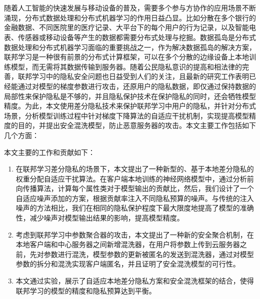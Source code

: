 \vspace{-2.5cm}
\chapter*{}

随着人工智能的快速发展与移动设备的普及，需要多个参与方协作的应用场景不断涌现，分布式数据处理和分布式机器学习的作用日益凸显。比如分散在多个银行的金融数据、不同医院里的医疗记录、大平台下的每个用户的行为记录，以及智能电表、传感器或移动设备等产生的数据都需要分布式处理与挖掘。数据孤岛是分布式数据处理和分布式机器学习面临的重要挑战之一，作为解决数据孤岛的解决方案，联邦学习是一种很有前景的分布式计算框架，可以在多个分散的边缘设备上本地训练模型，而无需将其数据传输到服务器。随着公民隐私意识的提高和相法律的完善，联邦学习中的隐私安全问题也日益受到人们的关注，且最新的研究工作表明已经能通过对模型的梯度参数进行攻击，还原用户的隐私数据，即仅通过保持数据的局部性来保护隐私是不够的，并且隐私保护技术在保护隐私的同时，还会牺牲模型精度。为此，本文使用差分隐私技术来保护联邦学习中用户的隐私，并针对分布式场景，分析模型训练过程中针对梯度下降算法的自适应干扰机制，实现提高模型精度的目的，并提出安全混洗模型，防止恶意服务器的攻击。本文主要工作包括如下几个方面：

本文主要的工作和贡献如下：
\begin{enumerate}
\item 在联邦学习差分隐私的场景下，本文提出了一种新型的、基于本地差分隐私的权重分配自适应干扰算法。在客户端本地训练的神经网络模型中，通过分析前向传播算法，计算每个属性类对于模型输出的贡献比，然后，我们设计了一个自适应噪声添加的方案，根据贡献率注入不同隐私预算的噪声。与传统的注入噪声的方法相比，我们在相同的隐私保护程度下最大限度地提高了模型的准确性，减少噪声对模型输出结果的影响，提高模型精度。
\item 考虑到联邦学习中参数聚合器的攻击，本文提出了一种新的安全聚合机制，在本地客户端和中心服务器之间新增混洗器，在用户将参数上传到云服务器之前，先对参数进行混洗，模型参数的更新被匿名的发送到混洗器，通过对模型参数的拆分和混洗实现客户端匿名，并且证明了安全混洗模型的可行性。
\item 本文通过实验，展示了自适应本地差分隐私方案和安全混洗框架的结合，使得联邦学习的模型的精度和隐私预算达到平衡。
\end{enumerate}
\hspace{-0.5cm}
 
